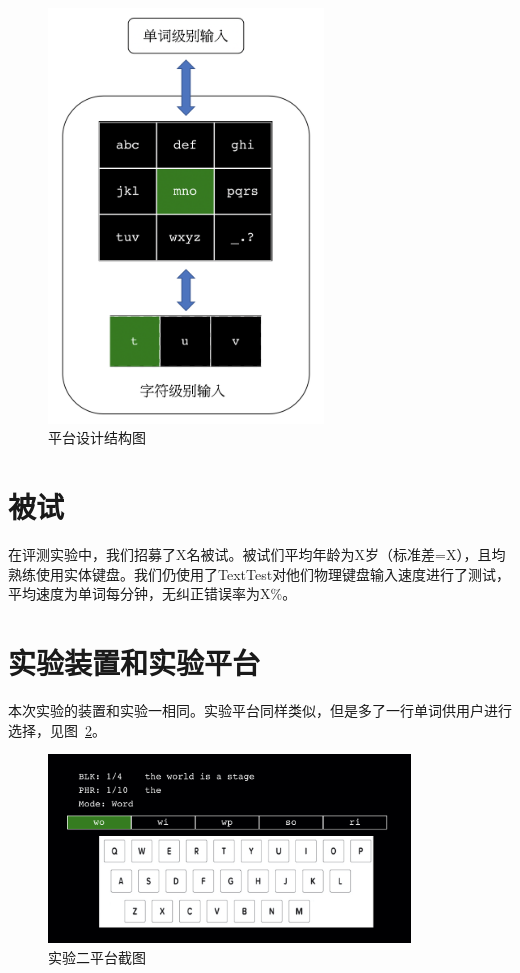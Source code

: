 \begin{figure}[htbp] %
    \centering
    \includegraphics[height=11cm]{figures/design.png}
    \caption{平台设计结构图}
    \label{fig:design}
\end{figure}

\section{被试}
在评测实验中，我们招募了X名被试。被试们平均年龄为X岁（标准差=X），且均熟练使用实体键盘。我们仍使用了TextTest\cite{texttest}\cite{wobbrock2006analyzing}对他们物理键盘输入速度进行了测试，平均速度为单词每分钟，无纠正错误率为X\%。

\section{实验装置和实验平台}
本次实验的装置和实验一相同。实验平台同样类似，但是多了一行单词供用户进行选择，见图~\ref{fig:platform1}。

\begin{figure}[h] %
    \centering
    \includegraphics[height=5cm]{figures/platform1.jpg}
    \caption{实验二平台截图}
    \label{fig:platform1}
\end{figure}

